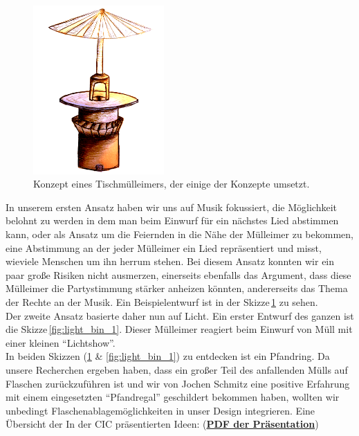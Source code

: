     \begin{figure}[H]
        \centering
        \includegraphics[width=5cm]{media/01_project/sketch_standing_table_bin.png}
        \caption{Konzept eines Tischmülleimers, der einige der Konzepte umsetzt.}
        \label{fig:standing_desk_bin_1}
    \end{figure}

    In unserem ersten Ansatz haben wir uns auf Musik fokussiert, die Möglichkeit belohnt zu werden in dem man beim Einwurf für ein nächstes Lied abstimmen kann, oder als Ansatz um die Feiernden in die Nähe der Mülleimer zu bekommen, eine Abstimmung an der jeder Mülleimer ein Lied repräsentiert und misst, wieviele Menschen um ihn herrum stehen. Bei diesem Ansatz konnten wir ein paar große Risiken nicht ausmerzen, einerseits ebenfalls das Argument, dass diese Mülleimer die Partystimmung stärker anheizen könnten, andererseits das Thema der Rechte an der Musik.
    Ein Beispielentwurf ist in der Skizze\,\ref{fig:standing_desk_bin_1} zu sehen.\\

    Der zweite Ansatz basierte daher nun auf Licht.
    Ein erster Entwurf des ganzen ist die Skizze\,\ref{fig:light_bin_1}.
    Dieser Mülleimer reagiert beim Einwurf von Müll mit einer kleinen \enquote{Lichtshow}.\\

    In beiden Skizzen (\ref{fig:standing_desk_bin_1} \& \ref{fig:light_bin_1}) zu entdecken ist ein Pfandring. Da unsere Recherchen ergeben haben, dass ein großer Teil des anfallenden Mülls auf Flaschen zurückzuführen ist und wir von Jochen Schmitz eine positive Erfahrung mit einem eingesetzten \enquote{Pfandregal} geschildert bekommen haben, wollten wir unbedingt Flaschenablagemöglichkeiten in unser Design integrieren.
    Eine Übersicht der In der CIC präsentierten Ideen: (\href{run:attachments/Frankfurt_Entwürfe_CIC.pdf}{\textbf{PDF der Präsentation}})

